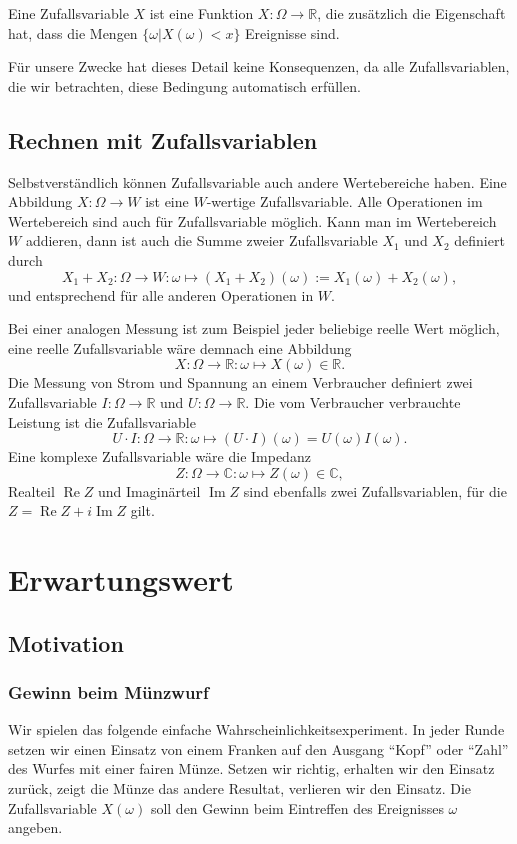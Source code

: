 \begin{definition}
Eine Zufallsvariable $X$ ist eine Funktion $X\colon \Omega\to \mathbb R$,
die zusätzlich die Eigenschaft hat, dass die Mengen 
$\{\omega | X(\omega) < x\}$ Ereignisse sind.
\end{definition}

Für unsere Zwecke hat dieses Detail keine Konsequenzen, da alle Zufallsvariablen,
die wir betrachten, diese Bedingung automatisch erfüllen.

\subsection{Rechnen mit Zufallsvariablen}
Selbstverständlich können Zufallsvariable auch andere Wertebereiche haben.
Eine Abbildung $X:\Omega\to W$ ist eine $W$-wertige Zufallsvariable.
Alle Operationen im Wertebereich sind auch für Zufallsvariable möglich.
Kann man im Wertebereich $W$ addieren, dann ist auch die Summe zweier
Zufallsvariable $X_1$ und $X_2$ definiert durch
\[
X_1+X_2:\Omega\to W:\omega\mapsto(X_1+X_2)(\omega) := X_1(\omega) + X_2(\omega),
\]
und entsprechend für alle anderen Operationen in $W$.

Bei einer analogen Messung ist zum Beispiel jeder beliebige reelle
Wert möglich, eine reelle Zufallsvariable wäre demnach eine Abbildung
\[
X:\Omega\to\mathbb R:\omega\mapsto X(\omega)\in\mathbb R.
\]
Die Messung von Strom und Spannung an einem Verbraucher definiert zwei
Zufallsvariable $I:\Omega\to\mathbb R$ und $U:\Omega\to \mathbb R$.
Die vom Verbraucher verbrauchte Leistung ist die Zufallsvariable
\[
U\cdot I:\Omega\to\mathbb R: \omega\mapsto (U\cdot I)(\omega) = U(\omega)I(\omega).
\]
Eine komplexe Zufallsvariable wäre die Impedanz
\[
Z:\Omega\to\mathbb C:\omega\mapsto Z(\omega)\in\mathbb C,
\]
Realteil $\operatorname{Re}Z$ und Imaginärteil $\operatorname{Im}Z$
sind ebenfalls zwei Zufallsvariablen,
für die $Z=\operatorname{Re}Z + i \operatorname{Im}Z$ gilt.

\section{Erwartungswert} \label{section-erwartungswert}
\subsection{Motivation}
\subsubsection{Gewinn beim Münzwurf}
Wir spielen das folgende einfache Wahrscheinlichkeitsexperiment.
In jeder Runde setzen wir einen Einsatz von einem Franken auf den
Ausgang ``Kopf'' oder ``Zahl'' des Wurfes mit einer fairen Münze.
Setzen wir richtig, erhalten wir den Einsatz zurück, zeigt die
Münze das andere Resultat, verlieren wir den Einsatz.
Die Zufallsvariable
$X(\omega)$ soll den Gewinn beim Eintreffen des Ereignisses $\omega$
angeben.

